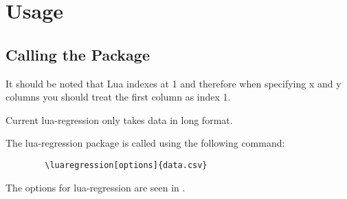 \documentclass[11pt]{article}
\begin{document}
    \section{Usage}

    \subsection{Calling the Package}
    
    \begin{warningbox}
    	It should be noted that Lua indexes at 1 and therefore when specifying x and y columns you should treat the first column as index 1.
    \end{warningbox}
    
    \begin{warningbox}
    	Current {\ttfamily lua-regression} only takes data in long format.
    \end{warningbox}

    The {\ttfamily lua-regression} package is called using the following command:

	\begin{codebox}
    \begin{verbatim}
        \luaregression[options]{data.csv}
    \end{verbatim}
    \end{codebox}

    
    The options for {\ttfamily lua-regression} are seen in .
\end{document}

